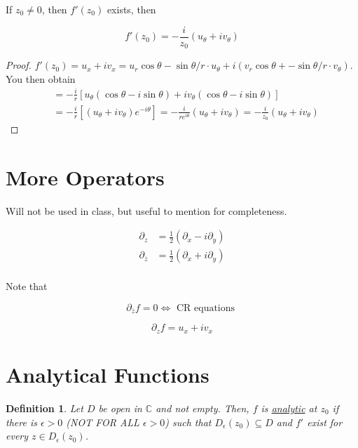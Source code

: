 \documentclass{article}
\newtheorem{definition}[theorem]{Definition}
\newtheorem{one minute paper}[theorem]{One Minute Paper}
\begin{document}
If $z_0 \neq 0$, then $f'(z_0)$ exists, then 

\begin{equation}
    f'(z_0) = -\frac{i}{z_0}\left( u_{\theta} +iv_{\theta} \right)
\end{equation}

\begin{proof}
    $f'(z_0) = u_x + iv_x =  u_r\cos\theta - \sin\theta/r \cdot u_{\theta} + i(v_r\cos\theta + -\sin\theta/r \cdot v_{\theta})$. You then obtain 
    \begin{align}
        &= -\frac{i}{r}\left[ u_{\theta}(\cos\theta - i\sin\theta) + iv_{\theta}(\cos\theta - i\sin\theta) \right]\\
        &= -\frac{i}{r}\left[ \left( u_{\theta} + iv_{\theta} \right)e^{-i\theta} \right] = -\frac{i}{re^{i\theta}}\left( u_{\theta} + iv_{\theta} \right) = -\frac{i}{z_0}\left( u_{\theta} + iv_{\theta} \right)
    \end{align}
\end{proof}

\section*{More Operators}

Will not be used in class, but useful to mention for completeness. 

\begin{align}
    \partial_z &= \frac{1}{2}\left( \partial_x - i\partial_y \right) \\
    \partial_{\overline{z}} &= \frac{1}{2}\left( \partial_x + i\partial_y \right) \\
\end{align}

Note that 

\begin{equation}
    \partial_{\overline{z}}f = 0 \iff \text{ CR equations }
\end{equation}

\begin{equation}
    \partial_{z}f = u_x + iv_x
\end{equation}

\section*{Analytical Functions}

\begin{definition}
    Let $D$ be open in $\mathbb{C}$ and not empty. Then, $f$ is \underline{analytic} at $z_0$ if there is $\epsilon >0$ (NOT FOR ALL $\epsilon>0$) such that $D_{\epsilon}(z_0) \subseteq D$ and $f'$ exist for every $z \in D_{\epsilon}(z_0)$. 
\end{definition}
\end{document}
